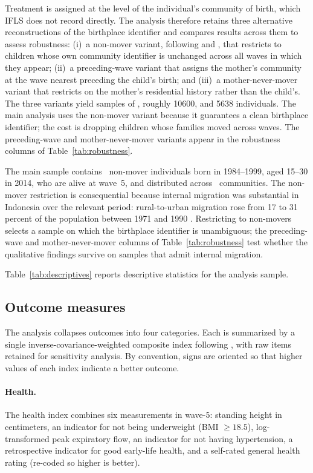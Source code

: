 Treatment is assigned at the level of the individual's community of birth, which IFLS does not record directly. The analysis therefore retains three alternative reconstructions of the birthplace identifier and compares results across them to assess robustness: (i)~a non-mover variant, following \textcite{cas2012} and \textcite{ahsan2021}, that restricts to children whose own community identifier is unchanged across all waves in which they appear; (ii)~a preceding-wave variant that assigns the mother's community at the wave nearest preceding the child's birth; and (iii)~a mother-never-mover variant that restricts on the mother's residential history rather than the child's. The three variants yield samples of \NPrimary, roughly \num{10600}, and \num{5638} individuals. The main analysis uses the non-mover variant because it guarantees a clean birthplace identifier; the cost is dropping children whose families moved across waves. The preceding-wave and mother-never-mover variants appear in the robustness columns of Table~\ref{tab:robustness}.

The main sample contains \NPrimary~non-mover individuals born in 1984--1999, aged 15--30 in 2014, who are alive at wave~5, and distributed across \NVillages~communities. The non-mover restriction is consequential because internal migration was substantial in Indonesia over the relevant period: rural-to-urban migration rose from 17 to 31 percent of the population between 1971 and 1990 \autocite{alatas1993}. Restricting to non-movers selects a sample on which the birthplace identifier is unambiguous; the preceding-wave and mother-never-mover columns of Table~\ref{tab:robustness} test whether the qualitative findings survive on samples that admit internal migration.

Table~\ref{tab:descriptives} reports descriptive statistics for the analysis sample.



\subsection{Outcome measures}

The analysis collapses outcomes into four categories. Each is summarized by a single inverse-covariance-weighted composite index following \textcite{anderson2008}, with raw items retained for sensitivity analysis. By convention, signs are oriented so that higher values of each index indicate a better outcome.

\paragraph{Health.} The health index combines six measurements in wave-5: standing height in centimeters, an indicator for not being underweight (BMI $\geq 18.5$), log-transformed peak expiratory flow, an indicator for not having hypertension, a retrospective indicator for good early-life health, and a self-rated general health rating (re-coded so higher is better).

